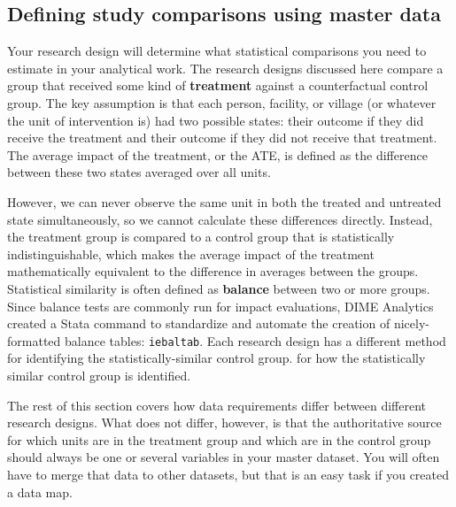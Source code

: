 \subsection{Defining study comparisons using master data}

Your research design will determine what statistical comparisons you need
to estimate in your analytical work.
The research designs discussed here compare a group that received
some kind of \textbf{treatment}
against a counterfactual control group.
The key assumption is that each
person, facility, or village (or whatever the unit of intervention is)
had two possible states: their outcome if they did receive the treatment
and their outcome if they did not receive that treatment.
The average impact of the treatment, or the ATE,
is defined as the difference 
between these two states averaged over all units.

However, we can never observe the same unit
in both the treated and untreated state simultaneously,
so we cannot calculate these differences directly.
Instead, the treatment group is compared to a control group
that is statistically indistinguishable,
which makes the average impact of the treatment
mathematically equivalent to the difference in averages between the groups.
Statistical similarity is often defined
as \textbf{balance} between two or more groups.	
Since balance tests are commonly run for impact evaluations,
DIME Analytics created a Stata command to 
standardize and automate the creation of nicely-formatted balance tables:
\texttt{iebaltab}.
Each research design has a different method	for identifying the statistically-similar control group. 
for how the statistically similar control group is identified.

The rest of this section covers how data requirements differ
between different research designs.
What does not differ, however, is that the authoritative source
for which units are in the treatment group and which are in the control group
should always be one or several variables in your master dataset. 
You will often have to merge that data to other datasets, 
but that is an easy task if you created a data map.


